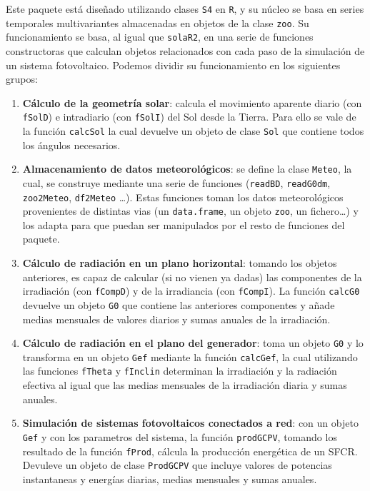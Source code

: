 Este paquete está diseñado utilizando clases \texttt{S4} en \texttt{R}, y su núcleo se basa en series temporales multivariantes almacenadas en objetos de la clase \texttt{zoo}. Su funcionamiento se basa, al igual que \texttt{solaR2}, en una serie de funciones constructoras que calculan objetos relacionados con cada paso de la simulación de un sistema fotovoltaico. Podemos dividir su funcionamiento en los siguientes grupos:
\begin{enumerate}
\item \textbf{Cálculo de la geometría solar}: calcula el movimiento aparente diario (con \texttt{fSolD}) e intradiario (con \texttt{fSolI}) del Sol desde la Tierra. Para ello se vale de la función \texttt{calcSol} la cual devuelve un objeto de clase \texttt{Sol} que contiene todos los ángulos necesarios.
\item \textbf{Almacenamiento de datos meteorológicos}: se define la clase \texttt{Meteo}, la cual, se construye mediante una serie de funciones (\texttt{readBD}, \texttt{readG0dm}, \texttt{zoo2Meteo}, \texttt{df2Meteo} \ldots{}). Estas funciones toman los datos meteorológicos provenientes de distintas vias (un \texttt{data.frame}, un objeto \texttt{zoo}, un fichero\ldots{}) y los adapta para que puedan ser manipulados por el resto de funciones del paquete.
\item \textbf{Cálculo de radiación en un plano horizontal}: tomando los objetos anteriores, es capaz de calcular (si no vienen ya dadas) las componentes de la irradiación (con \texttt{fCompD}) y de la irradiancia (con \texttt{fCompI}). La función \texttt{calcG0} devuelve un objeto \texttt{G0} que contiene las anteriores componentes y añade medias mensuales de valores diarios y sumas anuales de la irradiación.
\item \textbf{Cálculo de radiación en el plano del generador}: toma un objeto \texttt{G0} y lo transforma en un objeto \texttt{Gef} mediante la función \texttt{calcGef}, la cual utilizando las funciones \texttt{fTheta} y \texttt{fInclin} determinan la irradiación y la radiación efectiva al igual que las medias mensuales de la irradiación diaria y sumas anuales.
\item \textbf{Simulación de sistemas fotovoltaicos conectados a red}: con un objeto \texttt{Gef} y con los parametros del sistema, la función \texttt{prodGCPV}, tomando los resultado de la función \texttt{fProd}, cálcula la producción energética de un SFCR. Devuleve un objeto de clase \texttt{ProdGCPV} que incluye valores de potencias instantaneas y energías diarias, medias mensuales y sumas anuales.

\end{enumerate}
